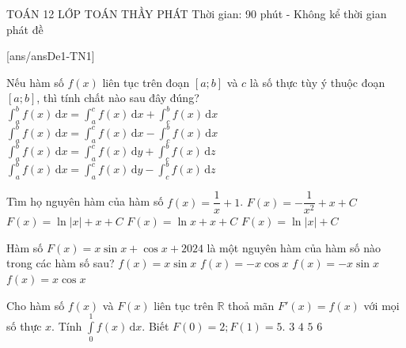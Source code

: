 \begin{name}
	{\tenchude}
	{TOÁN 12}
	{LỚP TOÁN THẦY PHÁT}
	{Thời gian: 90 phút - Không kể thời gian phát đề}
\end{name}
[ans/ansDe1-TN1]
\begin{ex}%
Nếu hàm số $f(x)$ liên tục trên đoạn $[a;b]$ và $c$ là số thực tùy ý thuộc đoạn $[a;b]$, thì tính chất nào sau đây đúng?
\choice
{\True $\displaystyle\int_a^b f(x) \mathrm{\,d}x = \displaystyle\int_a^c f(x) \mathrm{\,d}x + \displaystyle\int_c^b f(x)\mathrm{\,d}x$}
{$\displaystyle\int_a^b f(x)\mathrm{\,d}x = \displaystyle\int_a^c f(x) \mathrm{\,d}x - \displaystyle\int_c^b f(x) \mathrm{\,d}x$}
{$\displaystyle\int_a^b f(x)\mathrm{\,d}x = \displaystyle\int_a^c f(x)\mathrm{\,d}y + \displaystyle\int_c^b f(x) \mathrm{\,d}z$}
{$\displaystyle\int_a^b f(x)\mathrm{\,d}x = \displaystyle\int_a^c f(x)\mathrm{\,d}y - \displaystyle\int_c^b f(x)\mathrm{\,d}z$}
\end{ex}

\begin{ex}%
Tìm họ nguyên hàm của hàm số $f(x)=\dfrac{1}{x}+1$. \choice
{$F(x)=-\dfrac{1}{x^2}+x+C$}
{\True $F(x)=\ln |x|+x+C$}
{$F(x)=\ln x+x+C$}
{$F(x)=\ln |x|+C$}
\end{ex}

\begin{ex}%
Hàm số $F(x)=x\sin x+\cos x+2024$ là một nguyên hàm của hàm số nào trong các hàm số sau?
\choice
{ $f(x)=x\sin x$ }
{ $f(x)=-x\cos x$ }
{ $f(x)=-x\sin x$ }
{\True $f(x)=x\cos x$ }
\end{ex}

\begin{ex}%
Cho hàm số $f(x)$ và $F(x)$ liên tục trên $\mathbb{R}$ thoả mãn $F'(x)=f(x)$ với mọi số thực $x$. Tính   $\displaystyle \int\limits_0^1 f(x)\mathrm{\,d}x$. Biết $F(0)=2; F(1)=5$.
\choice
{\True $3$}
{$4$}
{$5$}
{$6$}
\end{ex}


